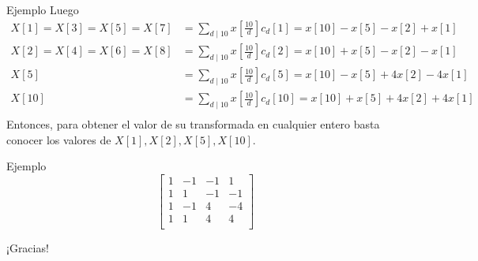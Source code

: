 \documentclass{beamer}
\begin{document}
\begin{frame}{Ejemplo}
    Luego
    {\scriptsize
    \begin{align*}
        X[1] = X[3] = X[5] = X[7] & = \sum_{d \mid 10} x \left[ \frac{10}{d} \right] c_d[1] = x[10] - x[5] - x[2] + x[1] \\
        X[2] = X[4] = X[6] = X[8] & = \sum_{d \mid 10} x \left[ \frac{10}{d} \right] c_d[2] = x[10] + x[5] - x[2] - x[1] \\
        X[5] & = \sum_{d \mid 10} x \left[ \frac{10}{d} \right] c_d[5] = x[10] - x[5] + 4 x[2] - 4 x[1] \\
        X[10] & = \sum_{d \mid 10} x \left[ \frac{10}{d} \right] c_d[10] = x[10] + x[5] + 4 x[2] + 4 x[1] \\
    \end{align*}}
    Entonces, para obtener el valor de su transformada en cualquier entero basta conocer los valores de $X[1], X[2], X[5], X[10]$.
\end{frame}

\begin{frame}{Ejemplo}
    \begin{equation*}
        \begin{bmatrix}
        1 & -1 & -1 & 1 \\
        1 & 1 & -1 & -1 \\
        1 & -1 & 4 & -4 \\
        1 & 1 & 4 & 4 \\
        \end{bmatrix}
    \end{equation*}
\end{frame}

\begin{frame}[standout]
¡Gracias!
\end{frame}
\end{document}
